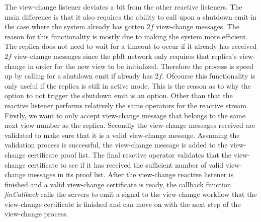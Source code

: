 The view-change listener deviates a bit from the other reactive listeners. The main difference is that it also requires the ability to call upon a shutdown emit in the case where the system already has gotten $2f$ view-change messages. The reason for this functionality is mostly due to making the system more efficient. The replica does not need to wait for a timeout to occur if it already has received $2f$ view-change messages since the \ac{pbft} network only requires that replica's view-change in order for the new view to be initialized. Therefore the process is speed up by calling for a shutdown emit if already has $2f$. Ofcourse this functionality is only useful if the replica is still in active mode. This is the reason as to why the option to not trigger the shutdown emit is an option. Other than that the reactive listener performs relatively the same operators for the reactive stream. Firstly, we want to only accept view-change message that belongs to the same next view number as the replica. Secondly the view-change messages received are validated to make sure that it is a valid view-change message. Assuming the validation process is successful, the view-change message is added to the view-change certificate proof list. The final reactive operator validates that the view-change certificate to see if it has received the sufficient number of valid view-change messages in its proof list. After the view-change reactive listener is finished and a valid view-change certificate is ready, the callback function \emph{finCallback} calls the servers to emit a signal to the view-change workflow that the view-change certificate is finished and can move on with the next step of the view-change process. 
 
